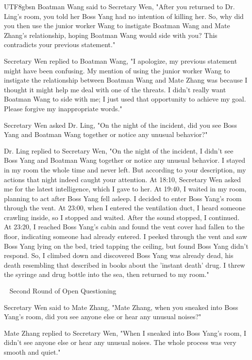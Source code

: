 \documentclass[11pt]{article}
\begin{document}
{\begin{CJK}{UTF8}{gbsn}
Boatman Wang said to Secretary Wen, "After you returned to Dr. Ling's room, you told her Boss Yang had no intention of killing her. So, why did you then use the junior worker Wang to instigate Boatman Wang and Mate Zhang's relationship, hoping Boatman Wang would side with you? This contradicts your previous statement."

Secretary Wen replied to Boatman Wang, "I apologize, my previous statement might have been confusing. My mention of using the junior worker Wang to instigate the relationship between Boatman Wang and Mate Zhang was because I thought it might help me deal with one of the threats. I didn't really want Boatman Wang to side with me; I just used that opportunity to achieve my goal. Please forgive my inappropriate words."

Secretary Wen asked Dr. Ling, "On the night of the incident, did you see Boss Yang and Boatman Wang together or notice any unusual behavior?"

Dr. Ling replied to Secretary Wen, "On the night of the incident, I didn’t see Boss Yang and Boatman Wang together or notice any unusual behavior. I stayed in my room the whole time and never left. But according to your description, my actions that night indeed caught your attention. At 18:10, Secretary Wen asked me for the latest intelligence, which I gave to her. At 19:40, I waited in my room, planning to act after Boss Yang fell asleep. I decided to enter Boss Yang's room through the vent. At 23:00, when I entered the ventilation duct, I heard someone crawling inside, so I stopped and waited. After the sound stopped, I continued. At 23:20, I reached Boss Yang's cabin and found the vent cover had fallen to the floor, indicating someone had already entered. I peeked through the vent and saw Boss Yang lying on the bed, tried tapping the ceiling, but found Boss Yang didn’t respond. So, I climbed down and discovered Boss Yang was already dead, his death resembling that described in books about the 'instant death' drug. I threw the syringe and drug bottle into the sea, then returned to my room."


\ \raisedrule[.5ex]{1pt} Second Round of Open Questioning \raisedrule[.5ex]{1pt} \


Secretary Wen said to Mate Zhang, "Mate Zhang, when you sneaked into Boss Yang's room, did you see anyone else or hear any unusual noises?"

Mate Zhang replied to Secretary Wen, "When I sneaked into Boss Yang's room, I didn't see anyone else or hear any unusual noises. The whole process was very smooth and quiet."


\end{CJK}}
\end{document}
